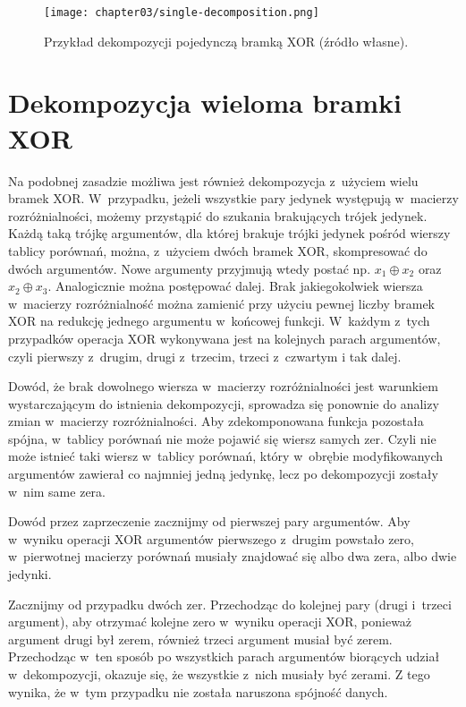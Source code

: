 \begin{figure}[H]
\centering
\texttt{[image: chapter03/single-decomposition.png]}
\caption{Przykład dekompozycji pojedynczą bramką XOR (źródło własne).}
\end{figure}

\section{Dekompozycja wieloma bramki XOR}

Na podobnej zasadzie możliwa jest również dekompozycja z~użyciem wielu bramek XOR.
W~przypadku,
jeżeli wszystkie pary jedynek występują w~macierzy rozróżnialności,
możemy przystąpić do szukania brakujących trójek jedynek.
Każdą taką trójkę argumentów,
dla której brakuje trójki jedynek pośród wierszy tablicy porównań,
można, z~użyciem dwóch bramek XOR,
skompresować do dwóch argumentów.
Nowe argumenty przyjmują wtedy postać np. $x_1 \oplus x_2$ oraz $x_2 \oplus x_3$.
Analogicznie można postępować dalej.
Brak jakiegokolwiek wiersza w~macierzy rozróżnialność można zamienić przy użyciu pewnej liczby bramek XOR na redukcję jednego argumentu w~końcowej funkcji.
W~każdym z~tych przypadków operacja XOR wykonywana jest na kolejnych parach argumentów,
czyli pierwszy z~drugim,
drugi z~trzecim,
trzeci z~czwartym i tak dalej.

Dowód,
że brak dowolnego wiersza w~macierzy rozróżnialności jest warunkiem wystarczającym do istnienia dekompozycji,
sprowadza się ponownie do analizy zmian w~macierzy rozróżnialności.
Aby zdekomponowana funkcja pozostała spójna,
w~tablicy porównań nie może pojawić się wiersz samych zer.
Czyli nie może istnieć taki wiersz w~tablicy porównań,
który w~obrębie modyfikowanych argumentów zawierał co najmniej jedną jedynkę,
lecz po dekompozycji zostały w~nim same zera.

Dowód przez zaprzeczenie zacznijmy od pierwszej pary argumentów.
Aby w~wyniku operacji XOR argumentów pierwszego z~drugim powstało zero,
w~pierwotnej macierzy porównań musiały znajdować się albo dwa zera,
albo dwie jedynki.

Zacznijmy od przypadku dwóch zer.
Przechodząc do kolejnej pary (drugi i~trzeci argument),
aby otrzymać kolejne zero w~wyniku operacji XOR,
ponieważ argument drugi był zerem,
również trzeci argument musiał być zerem.
Przechodząc w~ten sposób po wszystkich parach argumentów biorących udział w~dekompozycji,
okazuje się,
że wszystkie z~nich musiały być zerami.
Z tego wynika,
że w~tym przypadku nie została naruszona spójność danych.

